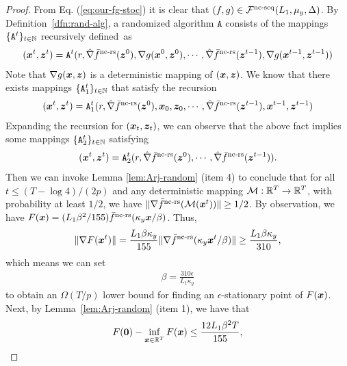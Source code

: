 \begin{proof}
From Eq. (\ref{eq:our-fg-stoc}) it is clear that $(f,g) \in  {\mathcal{F}}^{\text{nc-scq}}(L_1,\mu_y, \Delta)$.
By  Definition~\ref{dfn:rand-alg}, a randomized algorithm $\texttt{A}$ consists of the mappings $\{\texttt{A}^t \}_{t \in {\mathbb{N}}}$ recursively defined~as
\begin{align*}
    ({\bm{x}}^t,{\bm{z}}^t) = \texttt{A}^t(r, \hat \nabla \bar f^{\text{nc-rs}}({\bm{z}}^0), \nabla g({\bm{x}}^0,{\bm{z}}^0), \cdots, \hat \nabla \bar f^{\text{nc-rs}}({\bm{z}}^{t-1}), \nabla g({\bm{x}}^{t-1},{\bm{z}}^{t-1})   )
\end{align*}
Note that $\nabla g({\bm{x}},{\bm{z}})$ is a deterministic mapping of $({\bm{x}},{\bm{z}})$. We know that there exists mappings $\{\texttt{A}_1^t \}_{t \in {\mathbb{N}}}$ that satisfy the recursion
\begin{align*}
    ({\bm{x}}^t,{\bm{z}}^t) = \texttt{A}_1^t(r, \hat \nabla \bar f^{\text{nc-rs}}({\bm{z}}^0), {\bm{x}}_0,{\bm{z}}_0, \cdots, \hat \nabla \bar f^{\text{nc-rs}}({\bm{z}}^{t-1}), {\bm{x}}^{t-1}, {\bm{z}}^{t-1}   )
\end{align*}
Expanding the recursion for $({\bm{x}}_t,{\bm{z}}_t)$, we can observe that the above fact implies some mappings  $\{\texttt{A}_2^t \}_{t \in {\mathbb{N}}}$ satisfying 
\begin{align*}
     ({\bm{x}}^t,{\bm{z}}^t) = \texttt{A}_2^t(r, \hat \nabla \bar f^{\text{nc-rs}}({\bm{z}}^0), \cdots, \hat \nabla \bar f^{\text{nc-rs}}({\bm{z}}^{t-1}) ).
\end{align*}
Then we can invoke Lemma \ref{lem:Arj-random} (item 4) to conclude that for all $t \le (T - \log 4 ) /(2p)$ and any deterministic mapping ${\mathcal{M}} : {\mathbb{R}}^T \rightarrow {\mathbb{R}}^T$, with probability at least $1/2$, we have $\Vert \nabla \bar f^{\text{nc-rs}}({\mathcal{M}}({\bm{x}}^t)) \Vert \ge 1/2$.  By observation, we have $F({\bm{x}}) = (L_1 \beta^2 / 155) \bar f^{\text{nc-rs}}(\kappa_y {\bm{x}} / \beta) $. Thus,
\begin{align*}
    \Vert \nabla F({\bm{x}}^t) \Vert = \frac{L_1 \beta \kappa_y}{155} \Vert \nabla \bar f^{\text{nc-rs}}( \kappa_y {\bm{x}}^t / \beta)\Vert \ge \frac{L_1 \beta \kappa_y}{310},
\end{align*}
which means we can set
\begin{align} \label{eq:para-beta-stoc}
    \beta = \frac{310 \epsilon}{L_1 \kappa_y}
\end{align}
to obtain an $\Omega( T/p )$ lower bound for finding an $\epsilon$-stationary point of $F({\bm{x}})$. Next, by Lemma~\ref{lem:Arj-random} (item 1), we have that
\begin{align*}
    F({\bm{0}}) - \inf_{{\bm{x}} \in {\mathbb{R}}^T} F({\bm{x}}) \le \frac{12 L_1 \beta^2 T}{155},
\end{align*}

\end{proof}
